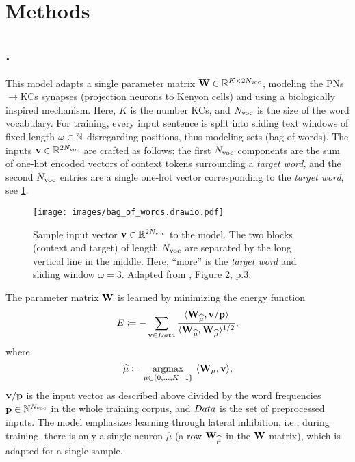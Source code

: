 \section{Methods}\label{sec:method}
\subsection{\flyvec\cite{flyvec}.}
This model adapts a single parameter matrix $\boldsymbol{\mathbf{W}} \in \mathbb{R}^{K\times2N_{\text{voc}}}$, modeling the PNs$\to$KCs synapses (projection neurons to Kenyon cells) and using a biologically inspired mechanism.
Here, $K$ is the number KCs, and $N_{\text{voc}}$ is the size of the word vocabulary.
For training, every input sentence is split into sliding text windows of fixed length $\omega\in\mathbb{N}$ disregarding positions, thus modeling sets (bag-of-words).
The inputs $\boldsymbol{\mathbf{v}} \in \mathbb{R}^{2N_{\text{voc}}}$ are crafted as follows: the first $N_{\text{voc}}$ components are the sum of one-hot encoded vectors of context tokens surrounding a \textit{target word}, and the second $N_{\text{voc}}$ entries are a single one-hot vector corresponding to the \textit{target word}, see \cref{fig:bag-of-words}.
\begin{figure}[tb]
    \centering
    \texttt{[image: images/bag\_of\_words.drawio.pdf]}
    \caption{Sample input vector $\boldsymbol{\mathbf{v}}\in\mathbb{R}^{2N_{\text{voc}}}$ to the \flyvec model. The two blocks (context and target) of length $N_{\text{voc}}$ are separated by the long vertical line in the middle. Here, \enquote{more} is the \textit{target word} and sliding window $\omega=3$. Adapted from \cite{flyvec}, Figure 2, p.3.}
    \label{fig:bag-of-words}
\end{figure}
The parameter matrix $\boldsymbol{\mathbf{W}}$ is learned by minimizing the energy function
\begin{equation}
E \coloneqq - \sum_{\boldsymbol{\mathbf{v}} \in Data}
                       {
                         \frac
                              { 
                                  \langle
                                  \boldsymbol{\mathbf{W}}_{\widehat{\mu}} , \boldsymbol{\mathbf{v}}/\boldsymbol{\mathbf{p}}
                                  \rangle 
                              }
                              { \langle
                                  \boldsymbol{\mathbf{W}}_{\widehat{\mu}},\boldsymbol{\mathbf{W}}_{\widehat{\mu}}
                                \rangle^{1/2} 
                              }
                       },
\label{eq:E}
\end{equation}
where
\begin{equation}
\widehat\mu \coloneqq \underset{\mu\in\{0,\dotsc,K-1\}}{\operatorname{argmax}} \ \langle \vect{W}_{\mu},\vect{v} \rangle,
\label{eq:argmax}
\end{equation}
$\boldsymbol{\mathbf{v}}/\boldsymbol{\mathbf{p}}$ is the input vector as described above divided by the word frequencies $\boldsymbol{\mathbf{p}}\in\mathbb{N}^{N_{\text{voc}}}$ in the whole training corpus, and $Data$ is the set of preprocessed inputs. 
The model emphasizes learning through lateral inhibition, i.e., during training, there is only a single neuron $\widehat\mu$ (a row $\boldsymbol{\mathbf{W}}_{\widehat\mu}$ in the $\boldsymbol{\mathbf{W}}$ matrix), which is adapted for a single sample.

